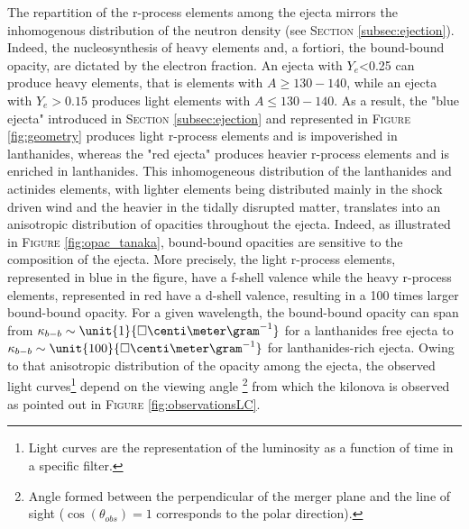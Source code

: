 \documentclass[a4paper, twoside, 11pt]{article}
\numberwithin{equation}{section}
\begin{document}
The repartition of the r-process elements among the ejecta mirrors the inhomogenous distribution of the neutron density (see S\textsc{ection} \ref{subsec:ejection}). Indeed, the nucleosynthesis of heavy elements and, a fortiori, the bound-bound opacity, are dictated by the electron fraction. An ejecta with $Y_e$<0.25 can produce heavy elements, that is elements with $A\geq 130-140$, while an ejecta with $Y_e>0.15$ produces light elements with $A\leq 130-140$. 
As a result, the "blue ejecta" introduced in S\textsc{ection} \ref{subsec:ejection} and represented in F\textsc{igure} \ref{fig:geometry} produces light r-process elements and is impoverished in lanthanides, whereas the "red ejecta" produces heavier r-process elements and is enriched in lanthanides. This inhomogeneous distribution of the lanthanides and actinides elements, with lighter elements being distributed mainly in the shock driven wind and the heavier in the tidally disrupted matter, translates into an anisotropic distribution of opacities throughout the ejecta. Indeed, as illustrated in F\textsc{igure} \ref{fig:opac_tanaka}, bound-bound opacities are sensitive to the composition of the ejecta. More precisely, the light r-process elements, represented in blue in the figure, have a f-shell valence while the heavy r-process elements,  represented in red have a d-shell valence,  resulting in a 100 times larger bound-bound opacity.  For a given wavelength, the bound-bound opacity can span from $\kappa_{b-b} \sim \unit{1}{\square{\centi\meter}\gram^{-1}}$ for a lanthanides free ejecta to $\kappa_{b-b} \sim \unit{100}{\square{\centi\meter}\gram^{-1}}$ for lanthanides-rich ejecta. Owing to that anisotropic distribution of the opacity among the ejecta, the observed light curves\footnote{Light curves are the representation of the luminosity as a function of time in a specific filter.} depend on the viewing angle \footnote{Angle formed between the perpendicular of the merger plane and the line of sight ($\cos(\theta_{obs})=1$ corresponds to the polar direction).} from which the kilonova is observed as pointed out in F\textsc{igure} \ref{fig:observationsLC}. 
\end{document}
